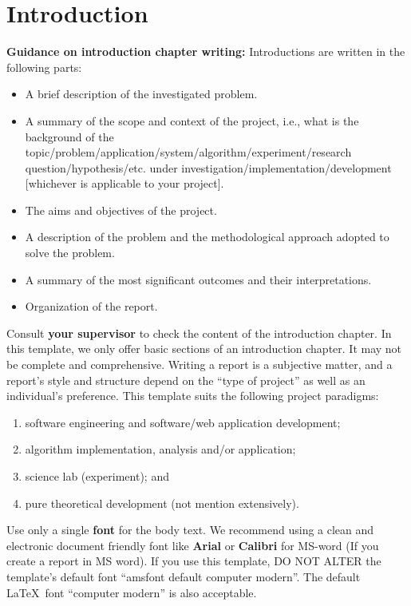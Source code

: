 \chapter{Introduction}
\label{ch:into} %

\textbf{Guidance on introduction chapter writing:} Introductions are written in the following parts:
\begin{itemize}
    \item A brief  description of the investigated problem.
    \item A summary of the scope and context of the project, i.e., what is the background of the topic/problem/application/system/algorithm/experiment/research question/hypothesis/etc. under investigation/implementation/development [whichever is applicable to your project].
    \item The aims and objectives of the project.
    \item A description of the problem and the methodological approach adopted to solve the problem.
    \item A summary of the most significant outcomes and their interpretations.
    \item Organization of the report. 
\end{itemize}


Consult \textbf{your supervisor} to check the content of the introduction chapter. In this template, we only offer basic sections of an introduction chapter. It may  not be complete and comprehensive. Writing a report is a subjective matter, and a report's style and structure depend on the ``type of project'' as well as an individual's preference. This template suits the following project paradigms:
\begin{enumerate}
    \item software engineering and software/web application development;
    \item algorithm implementation, analysis and/or application;  
    \item science lab (experiment); and
    \item pure theoretical development (not mention extensively).
\end{enumerate}

Use only a single \textbf{font} for the body text. We recommend using a clean and electronic document friendly font like \textbf{Arial} or \textbf{Calibri} for MS-word (If you create a report in MS word). If you use this template, DO NOT ALTER the template's default font ``amsfont default computer modern''. The default \LaTeX~font ``computer modern'' is also acceptable. 

